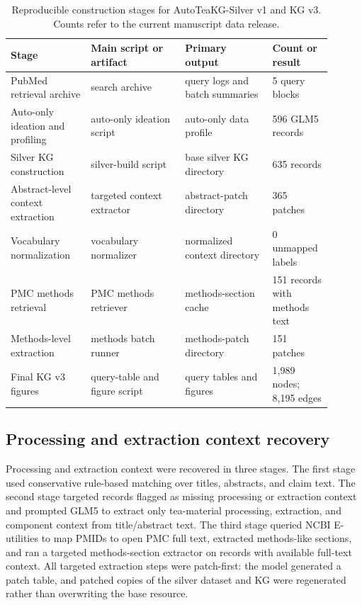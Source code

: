 \documentclass[11pt]{article}
\begin{document}
\begin{table}[t]
\centering
\small
\caption{Reproducible construction stages for AutoTeaKG-Silver v1 and KG v3. Counts refer to the current manuscript data release.}
\label{tab:pipeline_stages}
\begin{tabular}{p{0.23\linewidth}p{0.27\linewidth}p{0.25\linewidth}p{0.15\linewidth}}
\toprule
Stage & Main script or artifact & Primary output & Count or result \\
\midrule
PubMed retrieval archive & search archive & query logs and batch summaries & 5 query blocks \\
Auto-only ideation and profiling & auto-only ideation script & auto-only data profile & 596 GLM5 records \\
Silver KG construction & silver-build script & base silver KG directory & 635 records \\
Abstract-level context extraction & targeted context extractor & abstract-patch directory & 365 patches \\
Vocabulary normalization & vocabulary normalizer & normalized context directory & 0 unmapped labels \\
PMC methods retrieval & PMC methods retriever & methods-section cache & 151 records with methods text \\
Methods-level extraction & methods batch runner & methods-patch directory & 151 patches \\
Final KG v3 figures & query-table and figure script & query tables and figures & 1,989 nodes; 8,195 edges \\
\bottomrule
\end{tabular}
\end{table}

\subsection{Processing and extraction context recovery}

Processing and extraction context were recovered in three stages. The first stage used conservative rule-based matching over titles, abstracts, and claim text. The second stage targeted records flagged as missing processing or extraction context and prompted GLM5 to extract only tea-material processing, extraction, and component context from title/abstract text. The third stage queried NCBI E-utilities to map PMIDs to open PMC full text, extracted methods-like sections, and ran a targeted methods-section extractor on records with available full-text context. All targeted extraction steps were patch-first: the model generated a patch table, and patched copies of the silver dataset and KG were regenerated rather than overwriting the base resource.
\end{document}
